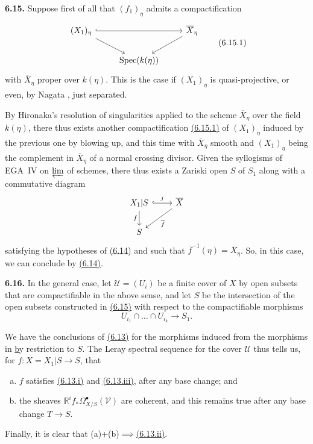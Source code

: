 \documentclass{report}
\newenvironment{rmenv}[1]
  {\phantomsection\par\medskip\noindent\textbf{#1.}\rmfamily}
  {\par\medskip}
\renewcommand{\cal}[1]{{\mathcal{#1}}}
\DeclareMathOperator{\Spec}{Spec}
\newcommand{\oldpage}[1]{\marginpar{\footnotesize$\Big\vert$ \textit{p.~#1}}}
\begin{document}
\begin{rmenv}{6.15}
\label{II.6.15}
  Suppose first of all that $(f_1)_\eta$ admits a compactification
  \[
  \label{II.6.15.1}
    \begin{tikzcd}
      (X_1)_\eta \ar[rr,hook] \drar[swap]
      && \overline{X}_\eta \dlar
    \\&\Spec(k(\eta))&
    \end{tikzcd}
  \tag{6.15.1}
  \]
  with $\overline{X}_\eta$ proper over $k(\eta)$.
  This is the case if $(X_1)_\eta$ is quasi-projective, or even, by Nagata \cite{20}, just separated.

  By Hironaka's resolution of singularities applied to the scheme $\overline{X}_\eta$ over the field $k(\eta)$, there thus exists another compactification \hyperref[II.6.15.1]{(6.15.1)} of $(X_1)_\eta$ induced by the previous one by blowing up, and this time with $\overline{X}_\eta$ smooth and $(X_1)_\eta$ being the complement in $\overline{X}_\eta$ of a normal crossing divisor.
  Given the syllogisms of EGA~IV on $\varprojlim$ of schemes, there thus exists a Zariski open $S$ of $S_1$ along with a commutative diagram
  \[
    \begin{tikzcd}
      X_1|S \rar[hook,"j"] \dar[swap,"f"]
      & \overline{X} \dlar["\overline{f}"]
    \\S
    \end{tikzcd}
  \]
  satisfying the hypotheses of \hyperref[II.6.14]{(6.14)} and such that $\overline{f}^{-1}(\eta)=\overline{X}_\eta$.
  So, in this case, we can conclude by \hyperref[II.6.14]{(6.14)}.
\end{rmenv}

\begin{rmenv}{6.16}
\label{II.6.16}
  In the general case, let $\cal{U}=(U_i)$ be a finite cover of $X$ by open subsets that are compactifiable in the above sense, and let $S$ be the intersection of the open subsets constructed in \hyperref[II.6.15]{(6.15)} with respect to the compactifiable morphisms
  \[
  \label{II.6.16.1}
    U_{i_1}\cap\ldots\cap U_{i_k} \to S_1.
  \tag{6.16.1}
  \]

\oldpage{108}
  We have the conclusions of \hyperref[II.6.13]{(6.13)} for the morphisms induced from the morphisms in \hyperref[II.6.16.1] by restriction to $S$.
  The Leray spectral sequence for the cover $\cal{U}$ thus tells us, for $f\colon X=X_1|S\to S$, that
  \begin{enumerate}[(a)]
    \item $f$ satisfies \hyperref[II.6.13]{(6.13.i)} and \hyperref[II.6.13]{(6.13.iii)}, after any base change; and
    \item the sheaves $\mathbb{R}^i f_*\Omega_{X/S}^\bullet(\cal{V})$ are coherent, and this remains true after any base change $T\to S$.
  \end{enumerate}

  Finally, it is clear that (a)+(b)$\implies$\hyperref[II.6.13]{(6.13.ii)}.
\end{rmenv}
\end{document}
